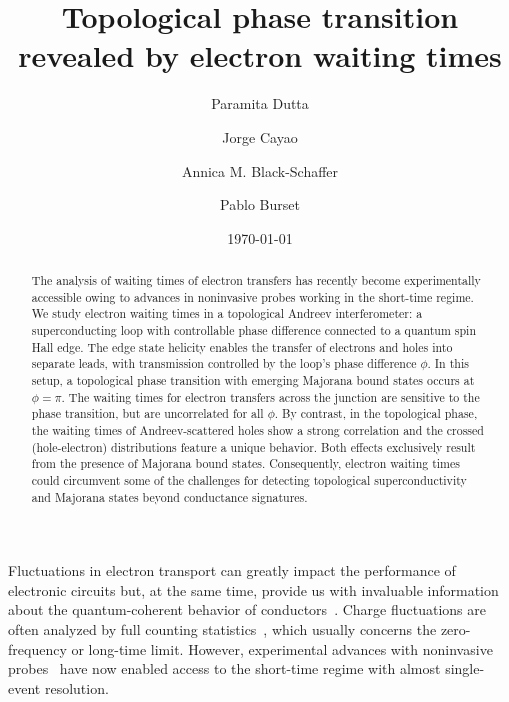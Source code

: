 \documentclass[aps,prl,amsmath,twocolumn,floatfix,superscriptaddress,longbibliography,footinbib]{revtex4-1}
\begin{document}
 

\title{Topological phase transition revealed by electron waiting times}

\author{Paramita Dutta\orcidA{}}

\author{Jorge Cayao\orcidB{}}

\author{Annica M. Black-Schaffer\orcidC{}}

\author{Pablo Burset\orcidD{}}

\date \today

\begin{abstract}
The analysis of waiting times of electron transfers has recently become experimentally accessible owing to advances in noninvasive probes working in the short-time regime. We study  electron waiting times in a topological Andreev interferometer: a superconducting loop with controllable phase difference connected to a quantum spin Hall edge. The edge state helicity enables the transfer of electrons and holes into separate leads, with transmission controlled by the loop's phase difference $\phi$. In this setup, a topological phase transition with emerging Majorana bound states occurs at $\phi=\pi$. The waiting times for electron transfers across the junction are sensitive to the phase transition, but are uncorrelated for all $\phi$. By contrast, in the topological phase, the waiting times of Andreev-scattered holes show a strong correlation and the crossed (hole-electron) distributions feature a unique behavior. Both effects exclusively result from the presence of Majorana bound states. Consequently, electron waiting times could circumvent some of the challenges for detecting topological superconductivity and Majorana states beyond conductance signatures. 
\end{abstract}

\maketitle

Fluctuations in electron transport can greatly impact the performance of electronic circuits but, at the same time, provide us with invaluable information about the quantum-coherent behavior of conductors~\cite{Blanter2000}. 
Charge fluctuations are often analyzed by full counting statistics~\cite{Levitov1996,Bagrets2003,Bagrets2006}, which usually concerns the zero-frequency or long-time limit. However, experimental advances with noninvasive probes~\cite{Camus2017,Geller2019,Pekola2019} have now enabled access to the short-time regime with almost single-event resolution. 
\end{document}
